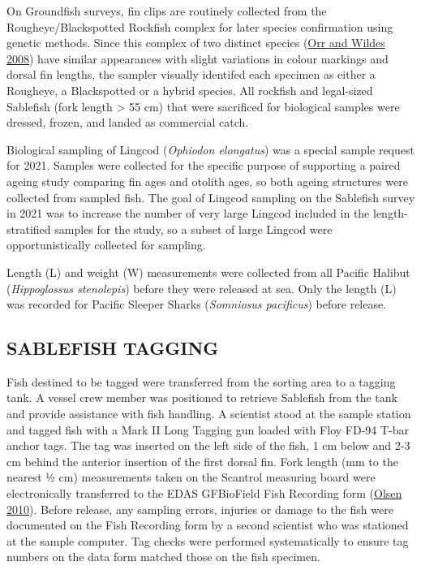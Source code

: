 \documentclass[12pt]{article}\usepackage[]{graphicx}\usepackage[]{color}
\begin{document}
On Groundfish surveys, fin clips are routinely collected from the Rougheye/Blackspotted Rockfish complex for later species confirmation using genetic methods. Since this complex of two distinct species (\protect\hyperlink{ref-Orr2008}{Orr and Wildes 2008}) have similar appearances with slight variations in colour markings and dorsal fin lengths, the sampler visually identifed each specimen as either a Rougheye, a Blackspotted or a hybrid species. All rockfish and legal-sized Sablefish (fork length \textgreater{} 55 cm) that were sacrificed for biological samples were dressed, frozen, and landed as commercial catch.

Biological sampling of Lingcod (\emph{Ophiodon elongatus}) was a special sample request for 2021. Samples were collected for the specific purpose of supporting a paired ageing study comparing fin ages and otolith ages, so both ageing structures were collected from sampled fish. The goal of Lingcod sampling on the Sablefish survey in 2021 was to increase the number of very large Lingcod included in the length-stratified samples for the study, so a subset of large Lingcod were opportunistically collected for sampling.

Length (L) and weight (W) measurements were collected from all Pacific Halibut (\emph{Hippoglossus stenolepis}) before they were released at sea. Only the length (L) was recorded for Pacific Sleeper Sharks (\emph{Somniosus pacificus}) before release.

\hypertarget{sablefish-tagging}{%
\subsection{SABLEFISH TAGGING}\label{sablefish-tagging}}

Fish destined to be tagged were transferred from the sorting area to a tagging tank. A vessel crew member was positioned to retrieve Sablefish from the tank and provide assistance with fish handling. A scientist stood at the sample station and tagged fish with a Mark II Long Tagging gun loaded with Floy FD-94 T-bar anchor tags. The tag was inserted on the left side of the fish, 1 cm below and 2-3 cm behind the anterior insertion of the first dorsal fin. Fork length (mm to the nearest ½ cm) measurements taken on the Scantrol measuring board were electronically transferred to the EDAS GFBioField Fish Recording form (\protect\hyperlink{ref-Olsen2010}{Olsen 2010}). Before release, any sampling errors, injuries or damage to the fish were documented on the Fish Recording form by a second scientist who was stationed at the sample computer. Tag checks were performed systematically to ensure tag numbers on the data form matched those on the fish specimen.
\end{document}
